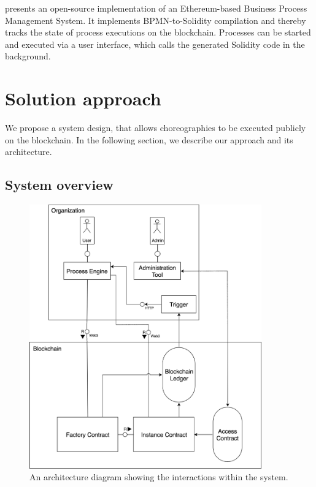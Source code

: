 \documentclass[runningheads]{llncs}
\begin{document}


\cite{lopez2017caterpillar} presents an open-source implementation of an Ethereum-based Business Process Management System.
It implements BPMN-to-Solidity compilation and thereby tracks the state of process executions on the blockchain.
Processes can be started and executed via a user interface, which calls the generated Solidity code in the background.


\section{Solution approach}
We propose a system design, that allows choreographies to be executed publicly on the blockchain.
In the following section, we describe our approach and its architecture.





\subsection{System overview}
\begin{figure}
	\centering
	\includegraphics[width=100mm]{fig/system_diagram.eps}
	\caption{An architecture diagram showing the interactions within the system.} 			
	\label{fig:system_diagram}
\end{figure}
\end{document}
